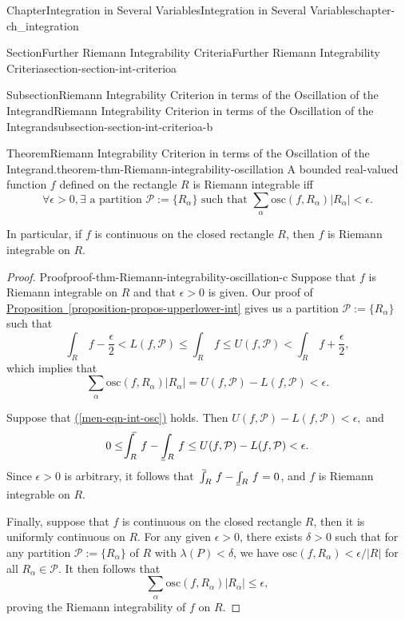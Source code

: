 \documentclass[oneside,10pt,]{book}
\makeatletter
\newcommand{\xreffont}{\relax}
\numberwithin{equation}{section}
\newcommand{\cP}{\mathcal{P}}
\newcommand{\osc}{\text{osc}}
\def\upint{\mathchoice
    {\mkern10mu\overline{\vphantom{\intop}\mkern7mu}\mkern-24mu}
    {\mkern7mu\overline{\vphantom{\intop}\mkern7mu}\mkern-14mu}
    {\mkern7mu\overline{\vphantom{\intop}\mkern7mu}\mkern-14mu}
    {\mkern7mu\overline{\vphantom{\intop}\mkern7mu}\mkern-14mu}
  \int}
\def\lowint{\relax\if@display
 \mkern3mu\underline{\vphantom{\intop}\mkern7mu}\mkern-10mu\int
\else 
\underline{\vphantom{\int}\mkern7mu}\mkern-10mu\int
\fi}
\makeatother
\begin{document}
\begin{chapterptx}{Chapter}{Integration in Several Variables}{}{Integration in Several Variables}{}{}{chapter-ch_integration}
\begin{sectionptx}{Section}{Further Riemann Integrability Criteria}{}{Further Riemann Integrability Criteria}{}{}{section-section-int-criterioa}
\begin{subsectionptx}{Subsection}{Riemann Integrability Criterion in terms of the Oscillation of the Integrand}{}{Riemann Integrability Criterion in terms of the Oscillation of the Integrand}{}{}{subsection-section-int-criterioa-b}
\begin{theorem}{Theorem}{Riemann Integrability Criterion in terms of the Oscillation of the Integrand.}{}{theorem-thm-Riemann-integrability-oscillation}
A bounded real-valued function \(f\) defined on the rectangle \(R\) is Riemann integrable iff%
\begin{equation}
\forall \epsilon >0, \exists  \text{ a partition }
\cP:=\{R_{\alpha}\} \text{ such that } 
\sum_{\alpha} \osc(f,R_{\alpha})\vert R_{\alpha} \vert < \epsilon.\label{men-eqn-int-osc}
\end{equation}
%
\par
In particular, if \(f\) is continuous on the closed rectangle \(R\), then \(f\) is Riemann integrable on \(R\).%
\end{theorem}
\begin{proof}{Proof}{}{proof-thm-Riemann-integrability-oscillation-c}
Suppose that \(f\) is Riemann integrable on \(R\) and that \(\epsilon>0\) is given. Our proof of \hyperref[proposition-propos-upperlower-int]{Proposition~{\xreffont\ref{proposition-propos-upperlower-int}}} gives us a partition \(\cP:=\{R_{\alpha}\}\) such that%
\begin{equation*}
\int_{R}\, f -\frac{\epsilon}{2} < L(f, \cP)\le \int_{R}\, f \le 
U (f, \cP)  < \int_{R}\, f  + \frac{\epsilon}{2},
\end{equation*}
which implies that%
\begin{equation*}
\sum_{\alpha} \osc(f,R_{\alpha})\vert R_{\alpha} \vert
=U (f, \cP)-L (f, \cP) < \epsilon.
\end{equation*}
%
\par
Suppose that \hyperref[men-eqn-int-osc]{({\xreffont\ref{men-eqn-int-osc}})} holds. Then \(U (f, \cP)-L (f, \cP) < \epsilon,\)  and%
\begin{equation*}
0\le \upint_{R}\, f  -\lowint_{R} \, f  \le U (f, \cP)-L (f, \cP) < \epsilon.
\end{equation*}
Since \(\epsilon >0\) is arbitrary, it follows that \(\upint_{R}\, f -\lowint_{R} \, f=0\),  and \(f\) is Riemann integrable on \(R\).%
\par
Finally, suppose that \(f\) is continuous on the closed rectangle \(R\), then it is uniformly continuous on \(R\). For any given \(\epsilon >0\), there exists \(\delta >0\) such that for any partition \(\cP:=\{R_{\alpha}\}\) of \(R\) with \(\lambda (P) < \delta\), we have \(\osc(f, R_{\alpha}) < \epsilon/\vert R\vert\) for all \(R_{\alpha} \in \cP\). It then follows that%
\begin{equation*}
\sum_{\alpha} \osc(f,R_{\alpha})\vert R_{\alpha} \vert \le \epsilon,
\end{equation*}
proving the Riemann integrability of \(f\) on \(R\).%
\end{proof}

\end{subsectionptx}
\end{sectionptx}
\end{chapterptx}
\end{document}

